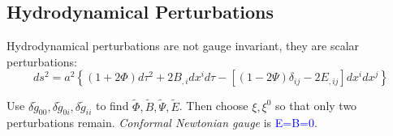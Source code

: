 \subsection{Hydrodynamical Perturbations}
\label{sec:hydrodynamical_perturbations}

Hydrodynamical perturbations are not gauge invariant, they are scalar perturbations:
\begin{equation*}
    ds^2=a^2\left\{\left(1+2\Phi\right)d\tau^2 +2B_{,i}dx^i d\tau - \left[\left(1-2\Psi\right)\delta_{ij}-2E_{,ij}\right]dx^i dx^j\right\}
\end{equation*}

Use $\delta \tilde{g}_{00}, \delta \tilde{g}_{0i}, \delta \tilde{g}_{ii} $ to find $\tilde{\Phi},\tilde{B},\tilde{\Psi},\tilde{E}$.
Then choose $\xi,\xi^0$ so that only two perturbations remain. \textit{Conformal Newtonian gauge} is \textcolor{blue}{E=B=0}.

